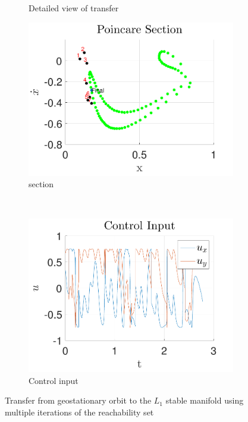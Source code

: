 \documentclass[preprint]{elsarticle}
\begin{document}
\begin{figure}
\begin{subfigure}[htbp]{0.5\textwidth}
		\caption{Detailed view of transfer} \label{fig:geo_transfer_zoom} 
	\end{subfigure} 
	
	\begin{subfigure}[htbp]{0.5\textwidth} 
		\includegraphics[width=\textwidth]{poincare} 
		\caption{\Poincare section} \label{fig:geo_transfer_poincare} 
	\end{subfigure}~%
	\begin{subfigure}[htbp]{0.5\textwidth} 
		\includegraphics[width=\textwidth]{control_input_geo} 
		\caption{Control input} \label{fig:control_input_geo} 
	\end{subfigure} 
	\caption{Transfer from geostationary orbit to the \( L_1 \) stable manifold using multiple iterations of the reachability set}
	\label{fig:geo_transfer} 
\end{figure}
\end{document}
